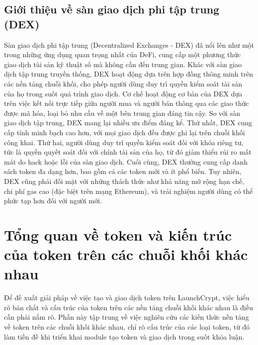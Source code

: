 \subsection{Giới thiệu về sàn giao dịch phi tập trung (DEX)}
\hspace{1cm}Sàn giao dịch phi tập trung (Decentralized Exchanges - DEX) đã nổi
lên như một trong những ứng dụng quan trọng nhất của DeFi, cung cấp một phương
thức giao dịch tài sản kỹ thuật số mà không cần đến trung gian. Khác với sàn
giao dịch tập trung truyền thống, DEX hoạt động dựa trên hợp đồng thông minh
trên
các nền tảng chuỗi khối, cho phép người dùng duy trì quyền kiểm soát tài sản
của họ trong
suốt quá trình giao dịch. Cơ chế hoạt động cơ bản của DEX dựa trên việc kết nối
trực tiếp giữa người mua và người bán thông qua các giao thức được mã hóa, loại
bỏ nhu cầu về một bên trung gian đáng tin cậy. So với sàn giao dịch tập trung,
DEX mang lại nhiều ưu điểm đáng kể. Thứ nhất, DEX cung cấp tính minh bạch cao
hơn, với mọi giao dịch đều được ghi lại trên chuỗi khối công khai. Thứ hai,
người dùng duy trì quyền kiểm soát đối với khóa riêng tư, tức là quyền quyết
soát đối với chính tài sản của họ, từ đó giảm thiểu rủi ro mất mát
do hack hoặc lỗi của sàn giao dịch. Cuối cùng, DEX thường cung cấp danh sách
token đa dạng hơn, bao gồm cả các token mới và ít phổ biến. Tuy nhiên, DEX cũng
phải đối mặt với những thách thức như khả năng mở rộng hạn chế, chi phí gas cao
(đặc biệt trên mạng Ethereum), và trải nghiệm người dùng có thể phức tạp hơn
đối với người mới.

\section{Tổng quan về token và kiến trúc của token trên các chuỗi khối khác
  nhau}
\hspace{1cm}Để đề xuất giải pháp về việc tạo và giao dịch token trên
LaunchCrypt, việc hiểu rõ bản chất và cấu trúc của token trên các nền tảng
chuỗi khối khác nhau là điều cần phải nắm rõ. Phần này tập trung về việc nghiên
cứu các kiến thức nền tảng về token trên các chuỗi khối khác nhau, chỉ rõ cấu
trúc của các loại token, từ đó làm tiền đề khi triển khai module tạo token và
giao dịch trong suốt khóa luận.

